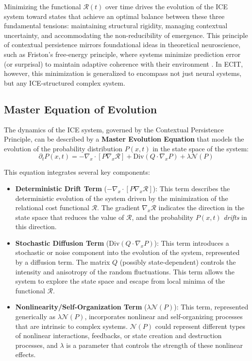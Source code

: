 \documentclass{article}
\begin{document}
Minimizing the functional $\mathcal{R}(t)$ over time drives the evolution of the ICE system toward states that achieve an optimal balance between these three fundamental tensions: maintaining structural rigidity, managing contextual uncertainty, and accommodating the non-reducibility of emergence. This principle of contextual persistence mirrors foundational ideas in theoretical neuroscience, such as Friston’s free-energy principle, where systems minimize prediction error (or surprisal) to maintain adaptive coherence with their environment \cite{Friston2010}. In ECIT, however, this minimization is generalized to encompass not just neural systems, but any ICE-structured complex system.

\subsection{Master Equation of Evolution}

The dynamics of the ICE system, governed by the Contextual Persistence Principle, can be described by a \textbf{Master Evolution Equation} that models the evolution of the probability distribution $P(x,t)$ in the state space of the system:
\begin{equation}
\partial_t P(x,t) = -\nabla_x \cdot [P \nabla_x \mathcal{R}] + \text{Div}(Q \cdot \nabla_x P) + \lambda \mathcal{N}(P)
\label{eq:ecuacion_maestra}
\end{equation}

This equation integrates several key components:
\begin{itemize}
    \item \textbf{Deterministic Drift Term} ($-\nabla_x \cdot [P \nabla_x \mathcal{R}]$): This term describes the deterministic evolution of the system driven by the minimization of the relational cost functional $\mathcal{R}$. The gradient $\nabla_x \mathcal{R}$ indicates the direction in the state space that reduces the value of $\mathcal{R}$, and the probability $P(x,t)$ \textit{drifts} in this direction.
    
    \item \textbf{Stochastic Diffusion Term} ($\text{Div}(Q \cdot \nabla_x P)$): This term introduces a stochastic or noise component into the evolution of the system, represented by a diffusion term. The matrix $Q$ (possibly state-dependent) controls the intensity and anisotropy of the random fluctuations. This term allows the system to explore the state space and escape from local minima of the functional $\mathcal{R}$.
    \item \textbf{Nonlinearity/Self-Organization Term} ($\lambda \mathcal{N}(P)$): This term, represented generically as $\lambda \mathcal{N}(P)$, incorporates nonlinear and self-organizing processes that are intrinsic to complex systems. $\mathcal{N}(P)$ could represent different types of nonlinear interactions, feedbacks, or state creation and destruction processes, and $\lambda$ is a parameter that controls the strength of these nonlinear effects.
\end{itemize}
\end{document}
